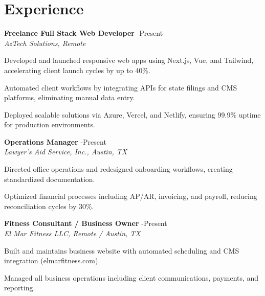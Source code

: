 \documentclass[letterpaper,10pt]{article}
\newcommand{\resumeItem}[1]{\item \small{#1}}
\begin{document}
\section*{Experience}
\begin{compactitem}
  \item[]
    \textbf{Freelance Full Stack Web Developer} -Present \\
    \textit{AzTech Solutions, Remote}
    \begin{compactitem}
      \resumeItem{Developed and launched responsive web apps using Next.js, Vue, and Tailwind, accelerating client launch cycles by up to 40\%.}
      \resumeItem{Automated client workflows by integrating APIs for state filings and CMS platforms, eliminating manual data entry.}
      \resumeItem{Deployed scalable solutions via Azure, Vercel, and Netlify, ensuring 99.9\% uptime for production environments.}
    \end{compactitem}

  \item[]
    \textbf{Operations Manager} -Present \\
    \textit{Lawyer's Aid Service, Inc., Austin, TX}
    \begin{compactitem}
      \resumeItem{Directed office operations and redesigned onboarding workflows, creating standardized documentation.}
      \resumeItem{Optimized financial processes including AP/AR, invoicing, and payroll, reducing reconciliation cycles by 30\%.}
    \end{compactitem}

  \item[]
    \textbf{Fitness Consultant / Business Owner} -Present \\
    \textit{El Mar Fitness LLC, Remote / Austin, TX}
    \begin{compactitem}
      \resumeItem{Built and maintains business website with automated scheduling and CMS integration (elmarfitness.com).}
      \resumeItem{Managed all business operations including client communications, payments, and reporting.}
    \end{compactitem}
\end{compactitem}
\end{document}

